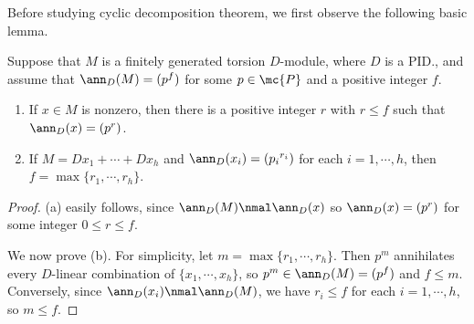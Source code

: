 Before studying cyclic decomposition theorem, we first observe the following basic lemma.
\begin{lem}
    Suppose that $M$ is a finitely generated torsion $D$-module, where $D$ is a PID., and assume that $\ann_D(M)=(p^f)$ for some $p\in\mc{P}$ and a positive integer $f$.
    \begin{enumerate}
        \item[(a)]
        {
            If $x\in M$ is nonzero, then there is a positive integer $r$ with $r\leq f$ such that $\ann_D(x)=(p^r)$.
        }
        \item[(b)]
        {
            If $M=Dx_1+\cdots+Dx_h$ and $\ann_D(x_i)=({p_i}^{r_i})$ for each $i=1, \cdots, h$, then $f=\max\{r_1, \cdots, r_h\}$.
        }
    \end{enumerate}
\end{lem}
\begin{proof}
    (a) easily follows, since $\ann_D(M)\nmal\ann_D(x)$ so $\ann_D(x)=(p^r)$ for some integer $0\leq r\leq f$.
    
    We now prove (b).
    For simplicity, let $m=\max\{r_1, \cdots, r_h\}$.
    Then $p^m$ annihilates every $D$-linear combination of $\{x_1, \cdots, x_h\}$, so $p^m\in\ann_D(M)=(p^f)$ and $f\leq m$.
    Conversely, since $\ann_D(x_i)\nmal\ann_D(M)$, we have $r_i\leq f$ for each $i=1, \cdots, h$, so $m\leq f$.
\end{proof}

